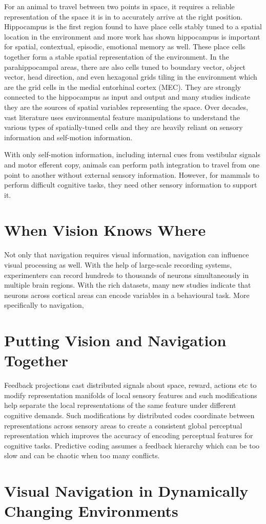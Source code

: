For an animal to travel between two points in space, it requires a reliable representation of the space it is in to accurately arrive at the right position. Hippocampus is the first region found to have place cells stably tuned to a spatial location in the environment and more work has shown hippocampus is important for spatial, contextual, episodic, emotional memory as well. These place cells together form a stable spatial representation of the environment. In the parahippocampal areas, there are also cells tuned to boundary vector, object vector, head direction, and even hexagonal grids tiling in the environment which are the grid cells in the medial entorhinal cortex (MEC). They are strongly connected to the hippocampus as input and output and many studies indicate they are the sources of spatial variables representing the space. Over decades, vast literature uses environmental feature manipulations to understand the various types of spatially-tuned cells and they are heavily reliant on sensory information and self-motion information.

With only self-motion information, including internal cues from vestibular signals and motor efferent copy, animals can perform path integration to travel from one point to another without external sensory information. However, for mammals to perform difficult cognitive tasks, they need other sensory information to support it. 

\section{When Vision Knows Where}
Not only that navigation requires visual information, navigation can influence visual processing as well. With the help of large-scale recording systems, experimenters can record hundreds to thousands of neurons simultaneously in multiple brain regions. With the rich datasets, many new studies indicate that neurons across cortical areas can encode variables in a behavioural task. More specifically to navigation, \cite{saleem_coherent_2018} \cite{mika_diamanti_spatial_2021}

\section{Putting Vision and Navigation Together}

Feedback projections cast distributed signals about space, reward, actions etc to modify representation manifolds of local sensory features and such modifications help separate the local representations of the same feature under different cognitive demands. Such modifications by distributed codes coordinate between representations across sensory areas to create a consistent global perceptual representation which improves the accuracy of encoding perceptual features for cognitive tasks. Predictive coding assumes a feedback hierarchy which can be too slow and can be chaotic when too many conflicts.
\cite{wen_one-shot_2024}
\section{Visual Navigation in Dynamically Changing Environments}




